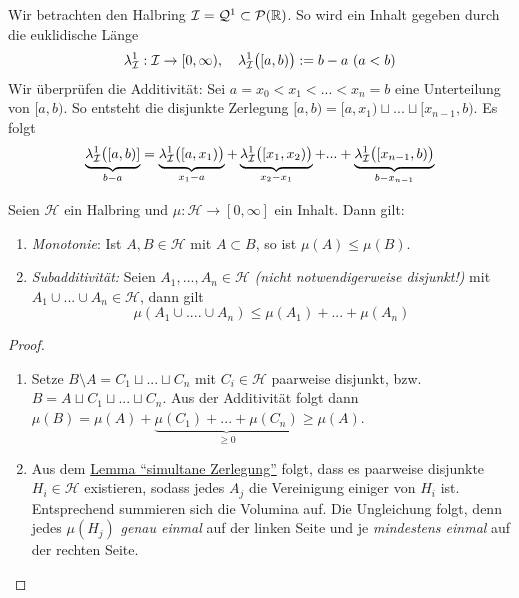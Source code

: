 \begin{example}
Wir betrachten den Halbring $\mathcal{I} = \mathcal{Q}^1 \subset \mathcal{P}(\mathbb{R})$. So wird ein Inhalt gegeben durch die euklidische Länge
\begin{align} \label{I23}
\lambda^1_{\mathcal{I}} : \mathcal{I} \to [0, \infty), \quad \lambda^1_{\mathcal{I}} \big([a,b)\big) := b-a \ (a<b)
\end{align}
Wir überprüfen die Additivität: Sei $a = x_0 < x_1 < ... < x_{n} = b$ eine Unterteilung von $[a,b)$. So entsteht die disjunkte Zerlegung $[a,b) = [a,x_1) \sqcup ... \sqcup [x_{n-1},b)$. Es folgt 
\begin{equation*}
\underbrace{\lambda^1_{\mathcal{I}} \big([a,b)]}_{b-a} = \underbrace{\lambda^1_{\mathcal{I}} \big( [a,x_1)\big)}_{x_1-a} + \underbrace{\lambda^1_{\mathcal{I}} \big([x_1,x_2)\big)}_{x_2 -x_1} + ... + \underbrace{\lambda^1_{\mathcal{I}} \big( [x_{n-1},b ) \big)}_{b-x_{n-1}}
\end{equation*}
\end{example}
\begin{lemma}
\begin{mdframed}
Seien $\mathcal{H}$ ein Halbring und $\mu:\mathcal{H} \longrightarrow [0,\infty]$ ein Inhalt. Dann gilt:
\begin{enumerate}[(\roman*),topsep=5pt, itemsep = 0 pt]
	\item \emph{Monotonie}: Ist $A, B \in \mathcal{H}$ mit $A \subset B$, so ist $\mu (A) \leq \mu (B)$.
	\item \emph{Subadditivität:} Seien $A_1, ..., A_n \in \mathcal{H}$ \emph{(nicht notwendigerweise disjunkt!)} mit $A_1 \cup ... \cup A_n \in \mathcal{H}$, dann gilt
	\begin{equation*}
	\mu(A_1 \cup .... \cup A_n) \leq \mu (A_1) + ... + \mu (A_n)
	\end{equation*}
\end{enumerate}
\end{mdframed}
\begin{proof} \
\begin{enumerate}[(\roman*),topsep=5pt, itemsep = 0 pt]
\item Setze $B \setminus A = C_1 \sqcup ... \sqcup C_n$ mit $C_i \in \mathcal{H}$ paarweise disjunkt, bzw. $B= A \sqcup C_1 \sqcup ... \sqcup C_n$. Aus der Additivität folgt dann $\mu(B) = \mu (A) + \underbrace{\mu(C_1) + ... + \mu (C_n)}_{\geq 0} \geq \mu (A)$.
\item Aus dem \hyperref[lemmaA]{Lemma ``simultane Zerlegung''} folgt, dass es paarweise disjunkte $H_i \in \mathcal{H}$ existieren, sodass jedes $A_j$ die Vereinigung einiger von $H_i$ ist. Entsprechend summieren sich die Volumina auf. Die Ungleichung folgt, denn jedes $\mu(H_j)$ \emph{genau einmal} auf der linken Seite und je \emph{mindestens einmal} auf der rechten Seite.
\end{enumerate}
\end{proof}
\end{lemma}

